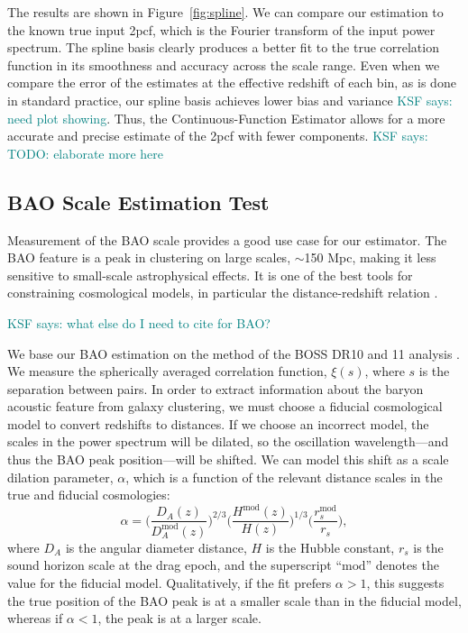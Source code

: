 \documentclass[modern]{aastex62}
\newcommand{\cf}{2pcf\xspace} %
\newcommand{\est}{the Continuous-Function Estimator\xspace}
\newcommand{\KSF}[1]{\textcolor{teal}{KSF says: #1}}
\begin{document}
The results are shown in Figure~\ref{fig:spline}.
We can compare our estimation to the known true input \cf, which is the Fourier transform of the input power spectrum.
The spline basis clearly produces a better fit to the true correlation function in its smoothness and accuracy across the scale range.
Even when we compare the error of the estimates at the effective redshift of each bin, as is done in standard practice, our spline basis achieves lower bias and variance \KSF{need plot showing}.
Thus, \est allows for a more accurate and precise estimate of the \cf with fewer components.
\KSF{TODO: elaborate more here}


\subsection{BAO Scale Estimation Test}
\label{sec:bao}

Measurement of the BAO scale provides a good use case for our estimator.
The BAO feature is a peak in clustering on large scales, $\sim$150 Mpc, making it less sensitive to small-scale astrophysical effects.
It is one of the best tools for constraining cosmological models, in particular the distance-redshift relation \citep{Kazin2010, Anderson2012, Anderson2014, Alam2016}.

\KSF{what else do I need to cite for BAO?}

We base our BAO estimation on the method of the BOSS DR10 and 11 analysis \citep{Anderson2014}.
We measure the spherically averaged correlation function, $\xi(s)$, where $s$ is the separation between pairs.
In order to extract information about the baryon acoustic feature from galaxy clustering, we must choose a fiducial cosmological model to convert redshifts to distances.
If we choose an incorrect model, the scales in the power spectrum will be dilated, so the oscillation wavelength---and thus the BAO peak position---will be shifted.
We can model this shift as a scale dilation parameter, $\alpha$, which is a function of the relevant distance scales in the true and fiducial cosmologies:
\begin{equation} \label{eq:alpha}
\alpha = \Bigg( \frac{D_A(z)}{D_A^{\text{mod}}(z)} \Bigg)^{2/3} \Bigg( \frac{H^{\text{mod}}(z)}{H(z)} \Bigg)^{1/3} \Bigg( \frac{r_s^{\text{mod}}}{r_s} \Bigg),
\end{equation}
where $D_A$ is the angular diameter distance, $H$ is the Hubble constant, $r_s$ is the sound horizon scale at the drag epoch, and the superscript ``$\text{mod}$'' denotes the value for the fiducial model.
Qualitatively, if the fit prefers $\alpha>1$, this suggests the true position of the BAO peak is at a smaller scale than in the fiducial model, whereas if $\alpha<1$, the peak is at a larger scale.
\end{document}
